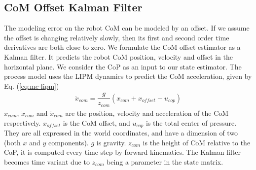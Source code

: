 \documentclass{ws-ijhr}
\newcommand{\eref}[1] {Eq. (\ref{#1})}
\begin{document}
\subsection{CoM Offset Kalman Filter}
The modeling error on the robot CoM can be modeled by an offset. If we assume the offset is changing relatively slowly, then its first and second order time derivatives are both close to zero. We formulate the CoM offset estimator as a Kalman filter. It predicts the robot CoM position, velocity and offset in the horizontal plane. 
We consider the CoP as an input to our state estimator. The process model uses the LIPM dynamics to predict the CoM acceleration, given by \eref{eq:me-lipm}
\begin{align}
 \ddot{x}_{com} = \dfrac{g}{z_{com}} (x_{com} + x_{offset} - u_{cop}) \label{eq:me-lipm}
\end{align}       
$x_{com}$, $\dot{x}_{com}$ and $\ddot{x}_{com}$ are the position, velocity and acceleration of the CoM respectively. $x_{offset}$ is the CoM offset, and $u_{cop}$ is the total center of pressure. They are all expressed in the world coordinates, and have a dimension of two (both $x$ and $y$ components). $g$ is gravity. $z_{com}$ is the height of CoM relative to the CoP, it is computed every time step by forward kinematics. The Kalman filter becomes time variant due to $z_{com}$ being a parameter in the state matrix.
\end{document}
